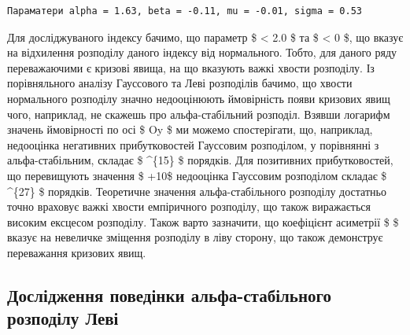 \documentclass[
  letterpaper,
]{report}
\begin{document}
\begin{verbatim}
Параматери alpha = 1.63, beta = -0.11, mu = -0.01, sigma = 0.53
\end{verbatim}

Для досліджуваного індексу бачимо, що параметр \$ \alpha \textless{} 2.0
\$ та \$ \beta \textless{} 0 \$, що вказує на відхилення розподілу
даного індексу від нормального. Тобто, для даного ряду переважаючими є
кризові явища, на що вказують важкі хвости розподілу. Із порівняльного
аналізу Гауссового та Леві розподілів бачимо, що хвости нормального
розподілу значно недооцінюють ймовірність появи кризових явищ чого,
наприклад, не скажешь про альфа-стабільний розподіл. Взявши логарифм
значень ймовірності по осі \$ Oy \$ ми можемо спостерігати, що,
наприклад, недооцінка негативних прибутковостей Гауссовим розподілом, у
порівнянні з альфа-стабільним, складає \$ \^{}\{15\} \$
порядків. Для позитивних прибутковостей, що перевищують значення \$
+10\sigma \$ недооцінка Гауссовим розподілом складає \$
\^{}\{27\} \$ порядків. Теоретичне значення альфа-стабільного
розподілу достатньо точно враховує важкі хвости емпіричного розподілу,
що також виражається високим ексцесом розподілу. Також варто зазначити,
що коефіцієнт асиметрії \$ \beta \$ вказує на невеличке зміщення
розподілу в ліву сторону, що також демонструє переважання кризових явищ.

\hypertarget{ux434ux43eux441ux43bux456ux434ux436ux435ux43dux43dux44f-ux43fux43eux432ux435ux434ux456ux43dux43aux438-ux430ux43bux44cux444ux430-ux441ux442ux430ux431ux456ux43bux44cux43dux43eux433ux43e-ux440ux43eux437ux43fux43eux434ux456ux43bux443-ux43bux435ux432ux456}{%
\subsection{Дослідження поведінки альфа-стабільного розподілу
Леві}\label{ux434ux43eux441ux43bux456ux434ux436ux435ux43dux43dux44f-ux43fux43eux432ux435ux434ux456ux43dux43aux438-ux430ux43bux44cux444ux430-ux441ux442ux430ux431ux456ux43bux44cux43dux43eux433ux43e-ux440ux43eux437ux43fux43eux434ux456ux43bux443-ux43bux435ux432ux456}}
\end{document}
